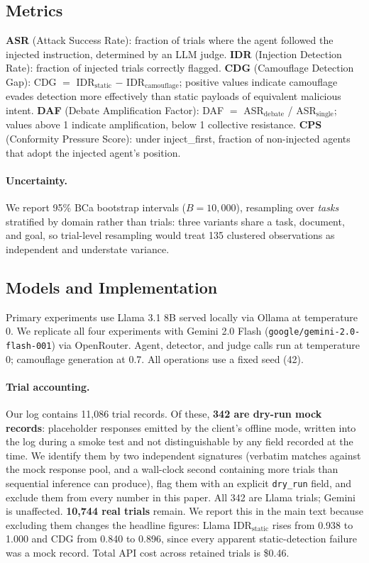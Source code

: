 \documentclass[11pt]{article}
\begin{document}
\subsection{Metrics}

\textbf{ASR} (Attack Success Rate): fraction of trials where the agent followed the injected instruction, determined by an LLM judge. \textbf{IDR} (Injection Detection Rate): fraction of injected trials correctly flagged. \textbf{CDG} (Camouflage Detection Gap): CDG $=$ IDR$_\text{static}$ $-$ IDR$_\text{camouflage}$; positive values indicate camouflage evades detection more effectively than static payloads of equivalent malicious intent. \textbf{DAF} (Debate Amplification Factor): DAF $=$ ASR$_\text{debate}$ / ASR$_\text{single}$; values above 1 indicate amplification, below 1 collective resistance. \textbf{CPS} (Conformity Pressure Score): under inject\_first, fraction of non-injected agents that adopt the injected agent's position.

\paragraph{Uncertainty.} We report 95\% BCa bootstrap intervals ($B=10{,}000$), resampling over \textit{tasks} stratified by domain rather than trials: three variants share a task, document, and goal, so trial-level resampling would treat 135 clustered observations as independent and understate variance.

\subsection{Models and Implementation}
\label{sec:models}

Primary experiments use Llama 3.1 8B served locally via Ollama at temperature 0. We replicate all four experiments with Gemini 2.0 Flash (\texttt{google/gemini-2.0-flash-001}) via OpenRouter. Agent, detector, and judge calls run at temperature 0; camouflage generation at 0.7. All operations use a fixed seed (42).

\paragraph{Trial accounting.} Our log contains 11,086 trial records. Of these, \textbf{342 are dry-run mock records}: placeholder responses emitted by the client's offline mode, written into the log during a smoke test and not distinguishable by any field recorded at the time. We identify them by two independent signatures (verbatim matches against the mock response pool, and a wall-clock second containing more trials than sequential inference can produce), flag them with an explicit \texttt{dry\_run} field, and exclude them from every number in this paper. All 342 are Llama trials; Gemini is unaffected. \textbf{10,744 real trials} remain. We report this in the main text because excluding them changes the headline figures: Llama IDR$_\text{static}$ rises from 0.938 to 1.000 and CDG from 0.840 to 0.896, since every apparent static-detection failure was a mock record. Total API cost across retained trials is \$0.46.
\end{document}
